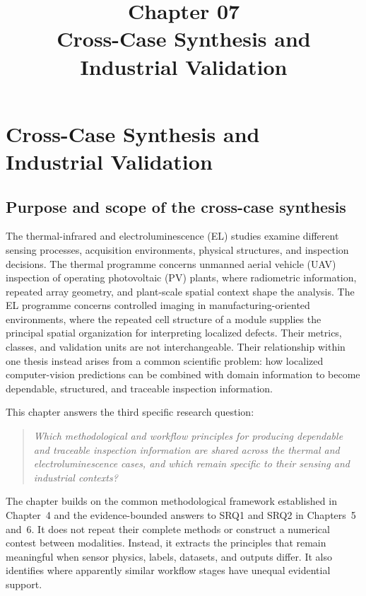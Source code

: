 \documentclass[12pt,a4paper]{report}
\title{Chapter 07\\Cross-Case Synthesis and Industrial Validation}
\author{}
\date{}
\begin{document}
\maketitle
\tableofcontents

\chapter{Cross-Case Synthesis and Industrial Validation}
\label{ch:cross-case}

\section{Purpose and scope of the cross-case synthesis}
\label{sec:ch07-purpose}

The thermal-infrared and electroluminescence (EL) studies examine different sensing processes, acquisition environments, physical structures, and inspection decisions. The thermal programme concerns unmanned aerial vehicle (UAV) inspection of operating photovoltaic (PV) plants, where radiometric information, repeated array geometry, and plant-scale spatial context shape the analysis. The EL programme concerns controlled imaging in manufacturing-oriented environments, where the repeated cell structure of a module supplies the principal spatial organization for interpreting localized defects. Their metrics, classes, and validation units are not interchangeable. Their relationship within one thesis instead arises from a common scientific problem: how localized computer-vision predictions can be combined with domain information to become dependable, structured, and traceable inspection information.

This chapter answers the third specific research question:

\begin{quote}
\emph{Which methodological and workflow principles for producing dependable and traceable inspection information are shared across the thermal and electroluminescence cases, and which remain specific to their sensing and industrial contexts?}
\end{quote}

The chapter builds on the common methodological framework established in Chapter~4 and the evidence-bounded answers to SRQ1 and SRQ2 in Chapters~5 and~6. It does not repeat their complete methods or construct a numerical contest between modalities. Instead, it extracts the principles that remain meaningful when sensor physics, labels, datasets, and outputs differ. It also identifies where apparently similar workflow stages have unequal evidential support.
\end{document}
